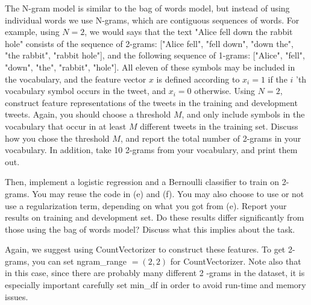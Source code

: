 \documentclass[10pt, a4paper]{article}
\begin{document}
\begin{Problem*}
    The $\mathrm{N}$-gram model is similar to the bag of words model, but instead of using individual words we use $\mathrm{N}$-grams, which are contiguous sequences of words. For example, using $N=2$, we would says that the text "Alice fell down the rabbit hole" consists of the sequence of 2-grams: ["Alice fell", "fell down", "down the", "the rabbit", "rabbit hole"], and the following sequence of 1-grams: ["Alice", "fell", "down", "the", "rabbit", "hole"]. All eleven of these symbols may be included in the vocabulary, and the feature vector $x$ is defined according to $x_{i}=1$ if the $i$ 'th vocabulary symbol occurs in the tweet, and $x_{i}=0$ otherwise. Using $N=2$, construct feature representations of the tweets in the training and development tweets. Again, you should choose a threshold $M$, and only include symbols in the vocabulary that occur in at least $M$ different tweets in the training set. Discuss how you chose the threshold $M$, and report the total number of 2-grams in your vocabulary. In addition, take 10 2-grams from your vocabulary, and print them out.

    Then, implement a logistic regression and a Bernoulli classifier to train on 2-grams. You may reuse the code in (e) and (f). You may also choose to use or not use a regularization term, depending on what you got from (e). Report your results on training and development set. Do these results differ significantly from those using the bag of words model? Discuss what this implies about the task.

Again, we suggest using CountVectorizer to construct these features. To get 2-grams, you can set ngram\_range $=(2,2)$ for CountVectorizer. Note also that in this case, since there are probably many different 2 -grams in the dataset, it is especially important carefully set min\_df in order to avoid run-time and memory issues.
\end{Problem*}
\end{document}
